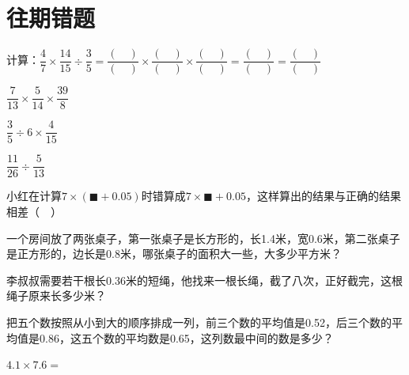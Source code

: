 \chapter{往期错题}

\begin{mistake}
计算：$\dfrac{4}{7}\times\dfrac{14}{15}\div\dfrac{3}{5}=\dfrac{(\quad)}{(\quad)}\times\dfrac{(\quad)}{(\quad)}\times\dfrac{(\quad)}{(\quad)}=\dfrac{(\quad)}{(\quad)}=\dfrac{(\quad)}{(\quad)}$
\end{mistake}

\vspace{5cm}
\begin{mistake}
$\dfrac{7}{13}\times\dfrac{5}{14}\times\dfrac{39}{8}$
\end{mistake}

\vspace{5cm}
\begin{mistake}
$\dfrac{3}{5}\div6\times\dfrac{4}{15}$
\end{mistake}

\vspace{5cm}
\begin{mistake}
$\dfrac{11}{26}\div\dfrac{5}{13}$
\end{mistake}

\vspace{5cm}
\begin{mistake}
小红在计算$7\times(\blacksquare+0.05)$时错算成$7\times\blacksquare+0.05$，这样算出的结果与正确的结果相差（$\quad$）
\end{mistake}

\vspace{5cm}
\begin{mistake}
一个房间放了两张桌子，第一张桌子是长方形的，长1.4米，宽0.6米，第二张桌子是正方形的，边长是0.8米，哪张桌子的面积大一些，大多少平方米？
\end{mistake}

\vspace{5cm}
\begin{mistake}
李叔叔需要若干根长0.36米的短绳，他找来一根长绳，截了八次，正好截完，这根绳子原来长多少米？
\end{mistake}

\vspace{5cm}
\begin{mistake}
把五个数按照从小到大的顺序排成一列，前三个数的平均值是0.52，后三个数的平均值是0.86，这五个数的平均数是0.65，这列数最中间的数是多少？
\end{mistake}

\vspace{5cm}
\begin{mistake}
$4.1\times7.6=$
\end{mistake}

